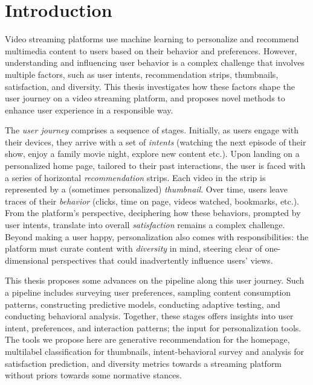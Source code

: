 
\chapter{Introduction}
\label{chapter:introduction}


Video streaming platforms use machine learning to personalize and recommend multimedia content to users based on their behavior and preferences. However, understanding and influencing user behavior is a complex challenge that involves multiple factors, such as user intents, recommendation strips, thumbnails, satisfaction, and diversity. This thesis investigates how these factors shape the user journey on a video streaming platform, and proposes novel methods to enhance user experience in a responsible way.

The \emph{user journey} comprises a sequence of stages. Initially, as users engage with their devices, they arrive with a set of \emph{intents} (watching the next episode of their show, enjoy a family movie night, explore new content etc.). Upon landing on a personalized home page, tailored to their past interactions, the user is faced with a series of horizontal \emph{recommendation} strips. Each video in the strip is represented by a (sometimes personalized) \emph{thumbnail}. Over time, users leave traces of their \emph{behavior} (clicks, time on page, videos watched, bookmarks, etc.).  From the platform's perspective, deciphering how these behaviors, prompted by user intents, translate into overall \emph{satisfaction} remains a complex challenge. Beyond making a user happy, personalization also comes with responsibilities: the platform must curate content with \emph{diversity} in mind, steering clear of one-dimensional perspectives that could inadvertently influence users' views.

This thesis proposes some advances on the pipeline along this user journey. Such a pipeline includes surveying user preferences, sampling content consumption patterns, constructing predictive models, conducting adaptive testing, and conducting behavioral analysis. Together, these stages offers insights into user intent, preferences, and interaction patterns; the input for personalization tools. The tools we propose here are generative recommendation for the homepage, multilabel classification for thumbnails, intent-behavioral survey and analysis for satisfaction prediction, and diversity metrics towards a streaming platform without priors towards some normative stances.

